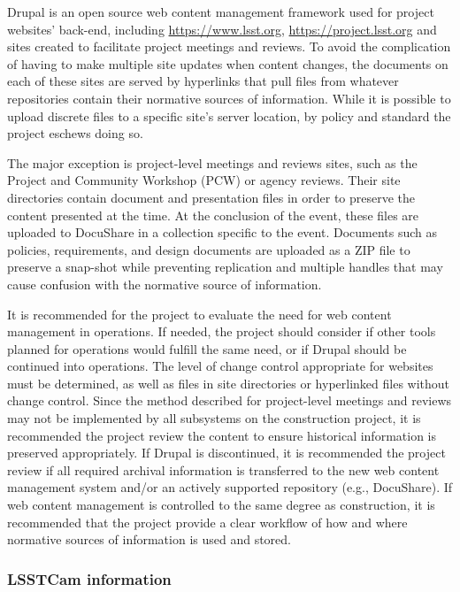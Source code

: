 Drupal \citep{drupal-cite} is an open source web content management framework used for project websites’ back-end, including \url{https://www.lsst.org}, \url{https://project.lsst.org} and sites created to facilitate project meetings and reviews.
To avoid the complication of having to make multiple site updates when content changes, the documents on each of these sites are served by hyperlinks that pull files from whatever repositories contain their normative sources of information.
While it is possible to upload discrete files to a specific site’s server location, by policy and standard the project eschews doing so.

The major exception is project-level meetings and reviews sites, such as the Project and Community Workshop (PCW) or agency reviews.
Their site directories contain document and presentation files in order to preserve the content presented at the time.
At the conclusion of the event, these files are uploaded to DocuShare in a collection specific to the event.
Documents such as policies, requirements, and design documents are uploaded as a ZIP file to preserve a snap-shot while preventing replication and multiple handles that may cause confusion with the normative source of information.

It is recommended for the project to evaluate the need for web content management in operations.
If needed, the project should consider if other tools planned for operations would fulfill the same need, or if Drupal should be continued into operations.
The level of change control appropriate for websites must be determined, as well as files in site directories or hyperlinked files without change control.
Since the method described for project-level meetings and reviews may not be implemented by all subsystems on the construction project, it is recommended the project review the content to ensure historical information is preserved appropriately.
If Drupal is discontinued, it is recommended the project review if all required archival information is transferred to the new web content management system and/or an actively supported repository (e.g., DocuShare).
If web content management is controlled to the same degree as construction, it is recommended that the project provide a clear workflow of how and where normative sources of information is used and stored.

\subsubsection{LSSTCam information}

